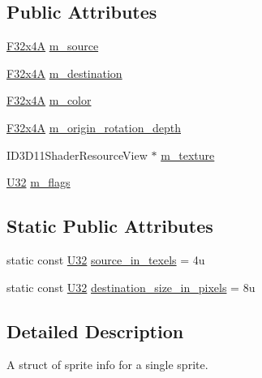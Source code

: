 \subsection*{Public Attributes}
\begin{DoxyCompactItemize}
\item 
\hyperlink{namespacemage_a0b6ac82244eb3edc5eb66c88a3ddef13}{F32x4A} \hyperlink{structmage_1_1_sprite_info_a9b9a0885e4c0927ab0310b810a5d2306}{m\+\_\+source}
\item 
\hyperlink{namespacemage_a0b6ac82244eb3edc5eb66c88a3ddef13}{F32x4A} \hyperlink{structmage_1_1_sprite_info_a297e27f13e1a0cc0d150658e8a0233b9}{m\+\_\+destination}
\item 
\hyperlink{namespacemage_a0b6ac82244eb3edc5eb66c88a3ddef13}{F32x4A} \hyperlink{structmage_1_1_sprite_info_ac2da3c6930c0682a3854f22a47a9a406}{m\+\_\+color}
\item 
\hyperlink{namespacemage_a0b6ac82244eb3edc5eb66c88a3ddef13}{F32x4A} \hyperlink{structmage_1_1_sprite_info_aea7fe05a8be92e45134bae349986c032}{m\+\_\+origin\+\_\+rotation\+\_\+depth}
\item 
I\+D3\+D11\+Shader\+Resource\+View $\ast$ \hyperlink{structmage_1_1_sprite_info_aea9963f991406a050bc5759fb05cfd5e}{m\+\_\+texture}
\item 
\hyperlink{namespacemage_a41c104c036fba3756a74e19f793eeaa1}{U32} \hyperlink{structmage_1_1_sprite_info_a9f3802944651a58e02831e5f2cb4a53e}{m\+\_\+flags}
\end{DoxyCompactItemize}
\subsection*{Static Public Attributes}
\begin{DoxyCompactItemize}
\item 
static const \hyperlink{namespacemage_a41c104c036fba3756a74e19f793eeaa1}{U32} \hyperlink{structmage_1_1_sprite_info_afe8aa37311d56f8411cfe878607f6f68}{source\+\_\+in\+\_\+texels} = 4u
\item 
static const \hyperlink{namespacemage_a41c104c036fba3756a74e19f793eeaa1}{U32} \hyperlink{structmage_1_1_sprite_info_a84baaa1612a26bcc076965c0997641c3}{destination\+\_\+size\+\_\+in\+\_\+pixels} = 8u
\end{DoxyCompactItemize}


\subsection{Detailed Description}
A struct of sprite info for a single sprite. 

